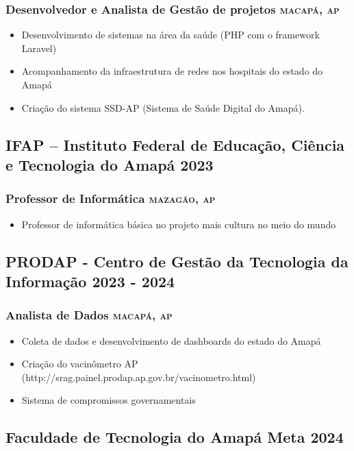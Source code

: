 \documentclass{article}
\newcommand{\rside}[1]{\hfill \normalfont\scshape\MakeLowercase{#1}}
\begin{document}
\subsubsection{ Desenvolvedor e  Analista de Gestão de projetos  \rside{Macapá, AP}}
\begin{itemize}
  \item Desenvolvimento de sistemas na área da saúde (PHP com o framework Laravel)
  \item Acompanhamento da infraestrutura de redes nos hospitais do estado do Amapá
  \item Criação do sistema SSD-AP (Sistema de Saúde Digital do Amapá).
\end{itemize}

\subsection{IFAP – Instituto Federal de Educação, Ciência e Tecnologia do Amapá  \rside{2023}}
\subsubsection{ Professor de Informática  \rside{Mazagão, AP}}
\begin{itemize}
  \item Professor de informática básica no projeto mais cultura no meio do mundo
\end{itemize}

\subsection{PRODAP - Centro de Gestão da Tecnologia da Informação  \rside{2023 - 2024}}
\subsubsection{ Analista de Dados  \rside{Macapá, AP}}
\begin{itemize}
  \item Coleta de dados e desenvolvimento de dashboards do estado do Amapá
  \item Criação do vacinômetro AP (http://srag.painel.prodap.ap.gov.br/vacinometro.html)
  \item Sistema de compromissos governamentais
\end{itemize}

\subsection{Faculdade de Tecnologia do Amapá Meta   \rside{2024}}
\end{document}
